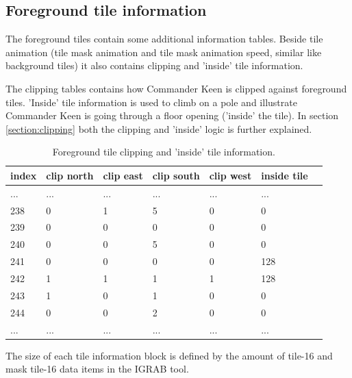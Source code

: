 \documentclass[book.tex]{subfiles}
\begin{document}
\subsection{Foreground tile information}
The foreground tiles contain some additional information tables. Beside tile animation (tile mask animation and tile mask animation speed, similar like background tiles) it also contains clipping and 'inside' tile information.\\
\par
The clipping tables contains how Commander Keen is clipped against foreground tiles. 'Inside' tile information is used to climb on a pole and illustrate Commander Keen is going through a floor opening ('inside' the tile). In section \ref{section:clipping} both the clipping and 'inside' logic is further explained.\\
\begin{table}[H]
  \begin{tabularx}{\textwidth}[c]{XXXXXXX}
  \hline
  \textbf{index} & \textbf{clip north} & \textbf{clip east} & \textbf{clip south} & \textbf{clip west}  & \textbf{inside tile} \\ \hline
  ...    & ...     & ...    & ...   & ...     & ...      \\
  238    & 0       & 1      & 5     & 0       & 0        \\
  239    & 0       & 0      & 0     & 0       & 0        \\
  240    & 0       & 0      & 5     & 0       & 0        \\
  241    & 0       & 0      & 0     & 0       & 128       \\
  242    & 1       & 1      & 1     & 1       & 128       \\
  243    & 1       & 0      & 1     & 0       & 0       \\
  244    & 0       & 0      & 2     & 0       & 0       \\
  ...    & ...     & ...    & ...   & ...     & ...     \\
  \end{tabularx}
  \caption{Foreground tile clipping and 'inside' tile information.}
  \end{table}










The size of each tile information block is defined by the amount of tile-16 and mask tile-16 data items in the IGRAB tool.\\
\par
\begin{minipage}{\textwidth}
 \par
 \end{minipage}
 
\end{document}
